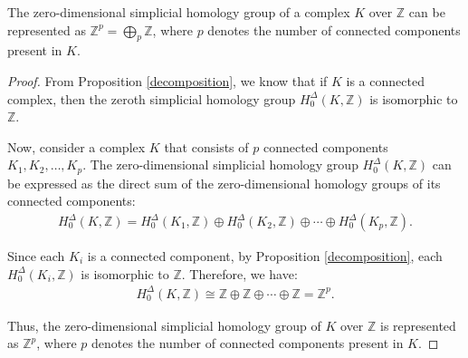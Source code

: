 \begin{corollary}
\label{directsum0hom}
The zero-dimensional simplicial homology group of a complex \( K \) over \( \mathbb{Z} \) can be represented as \( \mathbb{Z}^{p} = \bigoplus_{p} \mathbb{Z} \), where \( p \) denotes the number of connected components present in \( K \).
\end{corollary}

\begin{proof}
From Proposition \ref{decomposition}, we know that if \( K \) is a connected complex, then the zeroth simplicial homology group \( H^{\Delta}_{0}(K, \mathbb{Z}) \) is isomorphic to \( \mathbb{Z} \).

Now, consider a complex \( K \) that consists of \( p \) connected components \( K_1, K_2, \ldots, K_p \). The zero-dimensional simplicial homology group \( H^{\Delta}_{0}(K, \mathbb{Z}) \) can be expressed as the direct sum of the zero-dimensional homology groups of its connected components:
\begin{align}
H^{\Delta}_{0}(K, \mathbb{Z}) = H^{\Delta}_{0}(K_1, \mathbb{Z}) \oplus H^{\Delta}_{0}(K_2, \mathbb{Z}) \oplus \cdots \oplus H^{\Delta}_{0}(K_p, \mathbb{Z}).
\end{align}

Since each \( K_i \) is a connected component, by Proposition \ref{decomposition}, each \( H^{\Delta}_{0}(K_i, \mathbb{Z}) \) is isomorphic to \( \mathbb{Z} \). Therefore, we have:
\begin{align}
H^{\Delta}_{0}(K, \mathbb{Z}) \cong \mathbb{Z} \oplus \mathbb{Z} \oplus \cdots \oplus \mathbb{Z} = \mathbb{Z}^{p}.
\end{align}

Thus, the zero-dimensional simplicial homology group of \( K \) over \( \mathbb{Z} \) is represented as \( \mathbb{Z}^{p} \), where \( p \) denotes the number of connected components present in \( K \).
\end{proof}

